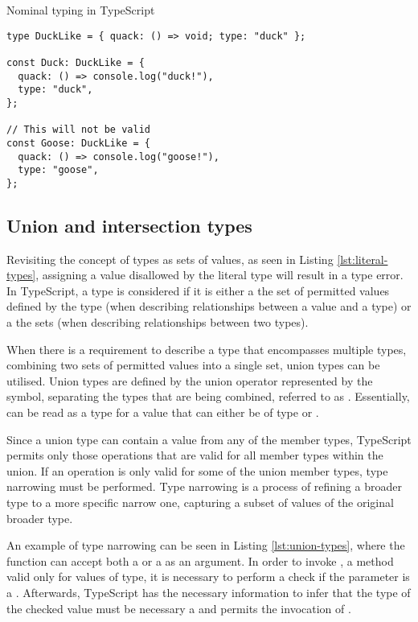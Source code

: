 \begin{listing}[ht]
  \caption{Nominal typing in TypeScript}\label{lst:nominal-types-emulation}
  \begin{verbatim}
type DuckLike = { quack: () => void; type: "duck" };

const Duck: DuckLike = {
  quack: () => console.log("duck!"),
  type: "duck",
};

// This will not be valid
const Goose: DuckLike = {
  quack: () => console.log("goose!"),
  type: "goose",
};
\end{verbatim}
\end{listing}

\subsection{Union and intersection types}\label{sec:union-intersection}

Revisiting the concept of types as sets of values, as seen in Listing \ref{lst:literal-types}, assigning a value disallowed by the literal type will result in a type error. In TypeScript, a type is considered  if it is either a  the set of permitted values defined by the type (when describing relationships between a value and a type) or a  the sets (when describing relationships between two types).

When there is a requirement to describe a type that encompasses multiple types, combining two sets of permitted values into a single set, union types can be utilised. Union types are defined by the union operator represented by the \code{|} symbol, separating the types that are being combined, referred to as  \cite{DocumentationEverydayTypes}. Essentially,  can be read as a type for a value that can either be of type  or .

Since a union type can contain a value from any of the member types, TypeScript permits only those operations that are valid for all member types within the union. If an operation is only valid for some of the union member types, type narrowing must be performed. Type narrowing is a process of refining a broader type to a more specific narrow one, capturing a subset of values of the original broader type.

An example of type narrowing can be seen in Listing \ref{lst:union-types}, where the function  can accept both a  or a  as an argument. In order to invoke , a method valid only for values of  type, it is necessary to perform a check if the parameter is a . Afterwards, TypeScript has the necessary information to infer that the type of the checked value must be necessary a  and permits the invocation of .

